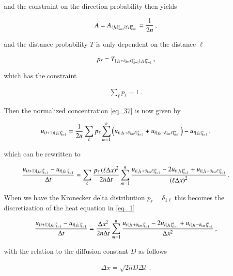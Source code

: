 \documentclass[11pt,english,a4paper]{article}
\begin{document}
\begin{flushleft}
and the constraint on the direction probability then yields

\begin{align}
A = A_{\left\lbrace{j_k}\right\rbrace_{k=1}^n\left\lbrace{\ell_k}\right\rbrace_{k=1}^n} = \frac{1}{2n}\,,
\label{eq_39}
\end{align}

and the distance probability $T$ is only dependent on the distance $\ell$

\begin{align*}
p_\ell = T_{\left\lbrace{j_k\pm\delta_{km} \ell}\right\rbrace_{k=1}^n\left\lbrace{j_k}\right\rbrace_{k=1}^n}\,,
\end{align*}

which has the constraint

\begin{align*}
\sum_{\ell} p_\ell = 1\,.
\end{align*}

Then the normalized concentration \eqref{eq_37} is now given by

\begin{align*}
u_{(i+1)\left({j_k}\right)_{k=1}^n} = \frac{1}{2n}\sum_\ell p_\ell\sum_{m=1}^n \left({u_{i\left\lbrace{j_k+\delta_{km}\ell}\right\rbrace_{k=1}^n} + u_{i\left\lbrace{j_k-\delta_{km}\ell}\right\rbrace_{k=1}^n}}\right) - u_{i\left\lbrace{j_k}\right\rbrace_{k=1}^n} \,,
\end{align*}

which can be rewritten to

\begin{align}
\frac{u_{(i+1)\left\lbrace{j_k}\right\rbrace_{k=1}^n}-u_{i\left\lbrace{j_k}\right\rbrace_{k=1}^n}}{\Delta t} = \sum_{\ell}\frac{p_\ell \left({\ell \Delta x}\right)^2}{2n\Delta t}\sum_{m=1}^n\frac{u_{i\left\lbrace{j_k+\delta_{km}\ell}\right\rbrace_{k=1}^n} - 2 u_{i\left\lbrace{j_k}\right\rbrace_{k=1}^n} + u_{i\left\lbrace{j_k-\delta_{km}\ell}\right\rbrace_{k=1}^n}}{\left({\ell\Delta x}\right)^2} \,.
\label{eq_40}
\end{align}

When we have the Kronecker delta distribution $p_\ell = \delta_{1\ell}$ this becomes the discretization of the heat equation in \eqref{eq_1} 

\begin{align*}
\frac{u_{(i+1)\left\lbrace{j_k}\right\rbrace_{k=1}^n}-u_{i\left\lbrace{j_k}\right\rbrace_{k=1}^n}}{\Delta t} = \frac{\Delta x^2}{2n\Delta t}\sum_{m=1}^n\frac{u_{i\left\lbrace{j_k+\delta_{km}}\right\rbrace_{k=1}^n} - 2 u_{i\left\lbrace{j_k}\right\rbrace_{k=1}^n} + u_{i\left\lbrace{j_k-\delta_{km}}\right\rbrace_{k=1}^n}}{\Delta x^2} \,,
\end{align*}

with the relation to the diffusion constant $D$ as follows

\begin{align}
\Delta x = \sqrt{2nD\Delta t}\,. 
\label{eq_41}
\end{align}


\end{flushleft}
\end{document}
